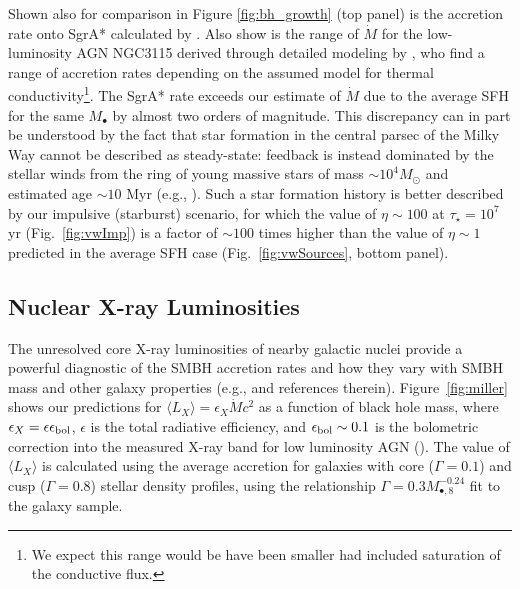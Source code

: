 \documentclass[usenatbib,fleqn]{mn2e}
\newcommand{\Mbheight}{M_{\bullet,8}}
\begin{document}

Shown also for comparison in Figure \ref{fig:bh_growth} (top panel) is
the accretion rate onto SgrA* calculated by \citet{Quataert:2004a}.
Also show is the range of $\dot{M}$ for the low-luminosity AGN NGC3115
derived through detailed modeling by \citet{ShcherbakovWong+:2014a},
who find a range of accretion rates depending on the assumed model for
thermal conductivity\footnote{We expect this range would be have been smaller
had \citet{ShcherbakovWong+:2014a} included saturation of the conductive flux.}.  The SgrA* rate
exceeds our estimate of $\dot{M}$ due to the average SFH for the same $M_{\bullet}$ by almost two orders of magnitude.
This discrepancy can in part be understood by the fact that star formation in
the central parsec of the Milky Way cannot be described as
steady-state: feedback is instead dominated by the stellar winds from
the ring of young massive stars of mass $\sim 10^{4}M_{\odot}$ and
estimated age $\sim 10$ Myr (e.g., \citealt{Schodel+07}).  Such a star
formation history is better described by our impulsive (starburst) scenario,
for which the value of $\eta \sim 100$ at $\tau_{\star} = 10^{7}$ yr
(Fig.~\ref{fig:vwImp}) is a factor of $\sim 100$ times higher than the
value of $\eta \sim 1$ predicted in the average SFH case
(Fig.~\ref{fig:vwSources}, bottom panel).


\subsection{Nuclear X-ray Luminosities}
\label{sec:Lx}

The unresolved core X-ray luminosities of nearby galactic nuclei provide a
powerful diagnostic of the SMBH accretion rates and how they vary with
SMBH mass and other galaxy properties (e.g., \citealt{Ho08} and
references therein).  Figure~\ref{fig:miller} shows our predictions
for $\langle L_{X} \rangle =\epsilon_X \dot{M} c^2$ as a function of
black hole mass, where $\epsilon_{X} = \epsilon\epsilon_{\rm bol}$,
$\epsilon$ is the total radiative efficiency, and $\epsilon_{\rm bol}
\sim 0.1$ is the bolometric correction into the measured X-ray band
for low luminosity AGN (\citealt{Ho08}).  The value of $\langle L_X
\rangle$ is calculated using the average accretion for galaxies with
core ($\Gamma = 0.1$) and cusp ($\Gamma = 0.8$) stellar density
profiles, using the relationship $\Gamma = 0.3 \Mbheight^{-0.24}$ fit
to the \citet{LauerFaber+:2007a} galaxy sample.
\end{document}
